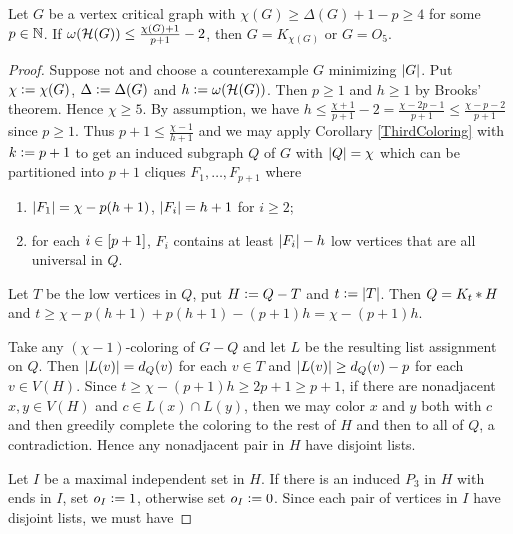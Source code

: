	\begin{cor}\label{ThirdColoring}
	Let $G$ be a vertex critical graph with $\chi(G) \geq \Delta(G) + 1 - p \geq 4$
	for some $p \in \mathbb{N}$.  If $\omega(\mathcal{H}(G)) \leq \frac{\chi(G) + 1}{p + 1} - 2$,
	then $G = K_{\chi(G)}$ or $G = O_5$.
	\end{cor}
	\begin{proof}
	Suppose not and choose a counterexample $G$ minimizing $\left|G\right|$.  Put
	$\chi \mathrel{\mathop:}= \chi(G)$, $\Delta \mathrel{\mathop:}= \Delta(G)$ and $h \mathrel{\mathop:}=
	\omega(\mathcal{H}(G))$. Then $p \geq 1$ and $h \geq 1$ by Brooks' theorem. Hence
	$\chi \geq 5$. By assumption, we have $h \leq \frac{\chi + 1}{p+1} - 2 =
	\frac{\chi - 2p - 1}{p + 1} \leq \frac{\chi - p - 2}{p + 1}$ since $p \geq 1$. 
	Thus $p + 1 \leq \frac{\chi - 1}{h + 1}$ and we may apply Corollary
	\ref{ThirdColoring} with $k \mathrel{\mathop:}= p + 1$ to get an induced subgraph $Q$ of
	$G$ with $\left|Q\right| = \chi$ which can be partitioned into $p + 1$ cliques $F_1,
	\ldots, F_{p + 1}$ where
			\begin{enumerate}
					\item $\left|F_1\right| = \chi - p(h + 1)$, $\left|F_i\right| = h	+ 1$ for $i \geq 2$;
					\item for each $i \in \left[p+1\right]$, $F_i$ contains at least $\left|F_i\right| -
					h$ low vertices that are all universal in $Q$.
			\end{enumerate}
Let $T$ be the low vertices in $Q$, put $H \mathrel{\mathop:}= Q - T$ and $t
\mathrel{\mathop:}= \left|T\right|$.  Then $Q = K_t \mbox{\hspace{2 pt}$\ast$\hspace{2 pt}} H$ and $t \geq \chi - p(h + 1) +
p(h + 1) - (p + 1)h = \chi - (p + 1)h$.  

Take any $(\chi - 1)$-coloring of $G-Q$ and let $L$ be the resulting list
assignment on $Q$.  Then $\left|L(v)\right| = d_Q(v)$ for each $v \in T$ and
$\left|L(v)\right| \geq d_Q(v) - p$ for each $v \in V(H)$.  Since $t \geq \chi - (p +
1)h \geq 2p + 1 \geq p + 1$, if there are nonadjacent $x,y \in V(H)$ and $c \in
L(x) \cap L(y)$, then we may color $x$ and $y$ both with $c$ and then greedily
complete the coloring to the rest of $H$ and then to all of $Q$, a
contradiction.  Hence any nonadjacent pair in $H$ have disjoint lists.

Let $I$ be a maximal independent set in $H$. If there is an induced $P_3$
in $H$ with ends in $I$, set $o_I \mathrel{\mathop:}= 1$, otherwise set $o_I
\mathrel{\mathop:}= 0$. Since each pair of vertices in $I$ have disjoint lists, we must
have


\end{proof}
